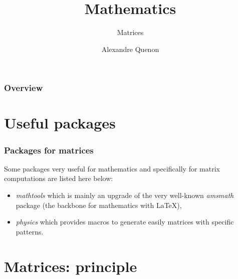 \documentclass[11pt]{beamer}
\title{Mathematics}
\subtitle{Matrices}
\author[A. Quenon]{Alexandre Quenon}
\begin{document}
\begin{frame}
	\titlepage
\end{frame}


\begin{frame}
	\frametitle{Overview}
	
	\tableofcontents
\end{frame}


\section{Useful packages}

\begin{frame}
	\frametitle{Packages for matrices}

	Some packages very useful for mathematics and specifically for matrix computations are listed here below:
	\begin{itemize}
		\item \emph{mathtools} which is mainly an upgrade of the very well-known \emph{amsmath} package (the backbone for mathematics with \LaTeX{}),
		\item \emph{physics} which provides macros to generate easily matrices with specific patterns.
	\end{itemize}
\end{frame}


\section{Matrices: principle}
\end{document}
